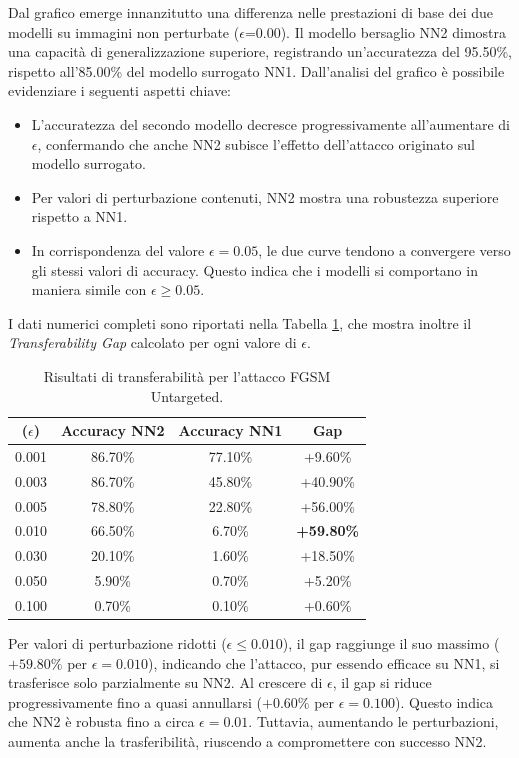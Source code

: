 \documentclass[a4paper, 12pt]{article}
\begin{document}
Dal grafico emerge innanzitutto una differenza nelle prestazioni di base dei due modelli su immagini non perturbate ($\epsilon$=0.00). Il modello bersaglio NN2 dimostra una capacità di generalizzazione superiore, registrando un'accuratezza del 95.50\%, rispetto all'85.00\% del modello surrogato NN1.
Dall'analisi del grafico è possibile evidenziare i seguenti aspetti chiave:
\begin{itemize}
    \item L'accuratezza del secondo modello decresce progressivamente all'aumentare di $\epsilon$, confermando che anche NN2 subisce l'effetto dell'attacco originato sul modello surrogato.
    \item Per valori di perturbazione contenuti, NN2 mostra una robustezza superiore rispetto a NN1.
    \item In corrispondenza del valore $\epsilon = 0.05$, le due curve tendono a convergere verso gli stessi valori di accuracy. Questo indica che i modelli si comportano in maniera simile con $\epsilon \geq 0.05$.
\end{itemize}
I dati numerici completi sono riportati nella Tabella \ref{tab:fgsm_tab_unt_transferability}, che mostra inoltre il \textit{Transferability Gap} calcolato per ogni valore di $\epsilon$.
\begin{table}[H]
    \centering
    \vspace{0.2cm}
    \begin{tabular}{cccc}
        \toprule
        \textbf{($\epsilon$)} & \textbf{Accuracy NN2} & \textbf{Accuracy NN1} & \textbf{Gap} \\
        \midrule
        0.001 & 86.70\% & 77.10\% & +9.60\% \\
        0.003 & 86.70\% & 45.80\% & +40.90\% \\
        0.005 & 78.80\% & 22.80\% & +56.00\% \\
        0.010 & 66.50\% &  6.70\% & \textbf{+59.80\%} \\
        0.030 & 20.10\% &  1.60\% & +18.50\% \\
        0.050 &  5.90\% &  0.70\% & +5.20\% \\
        0.100 &  0.70\% &  0.10\% & +0.60\% \\
        \bottomrule
    \end{tabular}
    \caption{Risultati di transferabilità per l'attacco FGSM Untargeted.}
    \label{tab:fgsm_tab_unt_transferability}
\end{table}

Per valori di perturbazione ridotti ($\epsilon \leq 0.010$), il gap raggiunge 
il suo massimo ($+59.80\%$ per $\epsilon = 0.010$), indicando 
che l'attacco, pur essendo efficace su NN1, si trasferisce solo parzialmente su NN2.
Al crescere di $\epsilon$, il gap si riduce progressivamente fino a quasi annullarsi 
($+0.60\%$ per $\epsilon = 0.100$). Questo indica che NN2 è robusta fino a circa $\epsilon = 0.01$. Tuttavia, aumentando le perturbazioni, aumenta anche la trasferibilità, riuscendo a compromettere con successo NN2.
\end{document}
